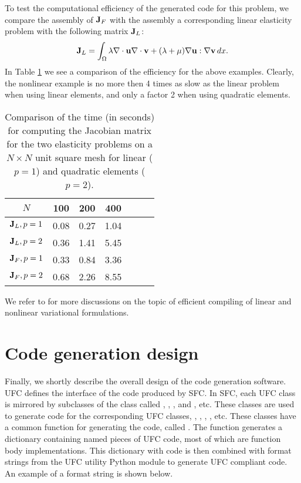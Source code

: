To test the computational efficiency of the generated code
for this problem, we compare the assembly of $\mathbf{J}_F$ with the assembly a corresponding linear
elasticity problem with the following matrix $\mathbf{J}_L$:
\[
\mathbf{J}_L = \int_\Omega \lambda \nabla \cdot \mathbf{u} \nabla \cdot \mathbf{v} + (\lambda + \mu)\nabla \mathbf{u}:\nabla \mathbf{v} \, dx . 
\]
In Table \ref{SFCtest} we see a comparison of the efficiency for the above examples. 
Clearly, the nonlinear example is no more then 4 times as slow as the linear problem when using linear elements, and only a factor 2 when 
using quadratic elements. 
\begin{table}[h]
\begin{center}
\begin{tabular}{|c|c|c|c|c|c|c|} \hline
$N$              & 100   & 200  & 400    \\ \hline 
$\mathbf{J}_L, p=1$     & 0.08  & 0.27  & 1.04     \\ \hline 
$\mathbf{J}_L, p=2$     & 0.36  & 1.41  & 5.45      \\ \hline 
$\mathbf{J}_F, p=1$     & 0.33  & 0.84  & 3.36     \\ \hline 
$\mathbf{J}_F, p=2$     & 0.68  & 2.26  & 8.55     \\ \hline 
\end{tabular}
\caption{Comparison of the time (in seconds) for computing the Jacobian matrix for 
the two elasticity problems on a $N\times N$ unit square mesh for linear ($p=1$) and quadratic elements ($p=2$).} 
\label{SFCtest}
\end{center}
\end{table}

We refer to \cite{AlnaesMardal2009b,OlgaardLoggEtAl2008,KirbyLogg2008b,oelgaard:2010}   
for more discussions on the topic of efficient compiling of linear and nonlinear variational formulations. 



\section{Code generation design}
Finally, we shortly describe the overall design of the code generation software.
UFC defines the interface of the code produced by SFC. 
In SFC, each UFC class is mirrored by  subclasses of the class  called 
, , , and , etc. 
These classes are used 
to generate code for the corresponding UFC classes, , , , 
, etc. These classes have 
a common function for generating the code, called .  
The function  generates a dictionary containing named
pieces of UFC code, most of which are function body implementations.
This dictionary with code is then combined with format strings from the
UFC utility Python module to generate UFC compliant code.  
An example of a format string is shown below.

